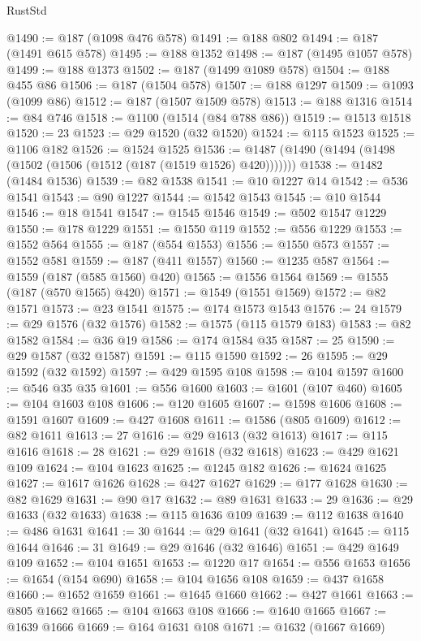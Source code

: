 \begin{lexlean}{RustStd}
\begin{coremodule}
@1490 := @187 (@1098 @476 @578)
@1491 := @188 @802
@1494 := @187 (@1491 @615 @578)
@1495 := @188 @1352
@1498 := @187 (@1495 @1057 @578)
@1499 := @188 @1373
@1502 := @187 (@1499 @1089 @578)
@1504 := @188 @455 @86
@1506 := @187 (@1504 @578)
@1507 := @188 @1297
@1509 := @1093 (@1099 @86)
@1512 := @187 (@1507 @1509 @578)
@1513 := @188 @1316
@1514 := @84 @746
@1518 := @1100 (@1514 (@84 @788 @86))
@1519 := @1513 @1518
@1520 := 23
@1523 := @29 @1520 (@32 @1520)
@1524 := @115 @1523
@1525 := @1106 @182
@1526 := @1524 @1525
@1536 := @1487 (@1490 (@1494 (@1498 (@1502 (@1506 (@1512 (@187 (@1519 @1526) @420)))))))
@1538 := @1482 (@1484 @1536)
@1539 := @82 @1538
@1541 := @10 @1227 @14
@1542 := @536 @1541
@1543 := @90 @1227
@1544 := @1542 @1543
@1545 := @10 @1544
@1546 := @18 @1541
@1547 := @1545 @1546
@1549 := @502 @1547 @1229
@1550 := @178 @1229
@1551 := @1550 @119
@1552 := @556 @1229
@1553 := @1552 @564
@1555 := @187 (@554 @1553)
@1556 := @1550 @573
@1557 := @1552 @581
@1559 := @187 (@411 @1557)
@1560 := @1235 @587
@1564 := @1559 (@187 (@585 @1560) @420)
@1565 := @1556 @1564
@1569 := @1555 (@187 (@570 @1565) @420)
@1571 := @1549 (@1551 @1569)
@1572 := @82 @1571
@1573 := @23 @1541
@1575 := @174 @1573 @1543
@1576 := 24
@1579 := @29 @1576 (@32 @1576)
@1582 := @1575 (@115 @1579 @183)
@1583 := @82 @1582
@1584 := @36 @19
@1586 := @174 @1584 @35
@1587 := 25
@1590 := @29 @1587 (@32 @1587)
@1591 := @115 @1590
@1592 := 26
@1595 := @29 @1592 (@32 @1592)
@1597 := @429 @1595 @108
@1598 := @104 @1597
@1600 := @546 @35 @35
@1601 := @556 @1600
@1603 := @1601 (@107 @460)
@1605 := @104 @1603 @108
@1606 := @120 @1605
@1607 := @1598 @1606
@1608 := @1591 @1607
@1609 := @427 @1608
@1611 := @1586 (@805 @1609)
@1612 := @82 @1611
@1613 := 27
@1616 := @29 @1613 (@32 @1613)
@1617 := @115 @1616
@1618 := 28
@1621 := @29 @1618 (@32 @1618)
@1623 := @429 @1621 @109
@1624 := @104 @1623
@1625 := @1245 @182
@1626 := @1624 @1625
@1627 := @1617 @1626
@1628 := @427 @1627
@1629 := @177 @1628
@1630 := @82 @1629
@1631 := @90 @17
@1632 := @89 @1631
@1633 := 29
@1636 := @29 @1633 (@32 @1633)
@1638 := @115 @1636 @109
@1639 := @112 @1638
@1640 := @486 @1631
@1641 := 30
@1644 := @29 @1641 (@32 @1641)
@1645 := @115 @1644
@1646 := 31
@1649 := @29 @1646 (@32 @1646)
@1651 := @429 @1649 @109
@1652 := @104 @1651
@1653 := @1220 @17
@1654 := @556 @1653
@1656 := @1654 (@154 @690)
@1658 := @104 @1656 @108
@1659 := @437 @1658
@1660 := @1652 @1659
@1661 := @1645 @1660
@1662 := @427 @1661
@1663 := @805 @1662
@1665 := @104 @1663 @108
@1666 := @1640 @1665
@1667 := @1639 @1666
@1669 := @164 @1631 @108
@1671 := @1632 (@1667 @1669)

\end{coremodule}
\end{lexlean}
